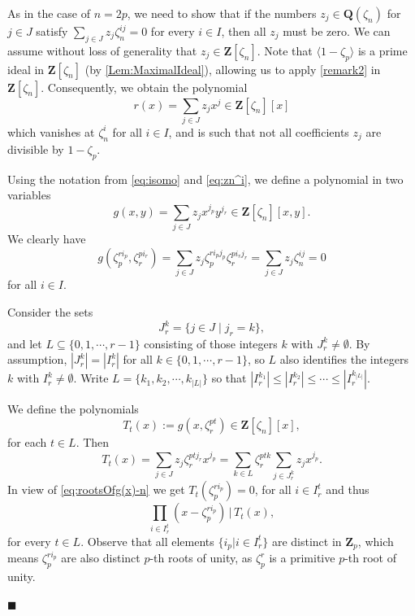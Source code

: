 \documentclass[10pt,a4paper]{amsart}
\newenvironment{proofofB}{{\bf {Proof of Theorem \ref{Thm:B}.} }}{\hfill $\blacksquare$ \\}
\def\Z{\mathbf{Z}}
\def\Q{\mathbf{Q}}
\begin{document}
\begin{proofofB}
As in the case of $n=2p$, we need to show that if the numbers $z_j \in \Q(\zeta_n)$ for $j \in J$ satisfy $\sum_{j \in J} z_j \zeta_n^{ij} = 0$ for every $i \in I$, then all $z_j$ must be zero. We can assume without loss of generality that $z_j \in \Z[\zeta_n]$. Note that $\langle 1 - \zeta_p \rangle$ is a prime ideal in $\Z[\zeta_n]$ (by \autoref{Lem:MaximalIdeal}), allowing us to apply \autoref{remark2} in $\Z[\zeta_n]$. Consequently, we obtain the polynomial 
\begin{equation}\label{eq:r(x)-n}
r(x) = \sum_{j \in J} z_j x^{j} \in \Z[\zeta_n][x]
\end{equation}
which vanishes at $\zeta_n^i$ for all $i \in I$, and is such that not all coefficients $z_j$ are  divisible by $1 - \zeta_p$.

Using the notation from \eqref{eq:isomo} and \eqref{eq:zn^i}, we define a polynomial in two variables 
\begin{equation}\label{eq:g(x)-n}
g(x,y) = \sum_{j \in J }z_jx^{j_p}y^{j_r}  \in \Z[\zeta_n][x,y]. 
\end{equation}
We clearly have 
\begin{equation}\label{eq:rootsOfg(x)-n}
g(\zeta_p^{ri_p},\zeta_r^{pi_r}) = \sum_{j \in J }z_j \zeta_p^{ri_pj_p}\zeta_r^{pi_rj_r} = \sum_{j \in J }z_j \zeta_n^{ij}= 0 
\end{equation}
for all $i \in I$.

Consider the sets 
\begin{equation}
  J_r^k = \{ j \in J \mid j_r = k  \},    
\end{equation}
and let  $L \subseteq \{ 0, 1, \cdots, r-1\}$ consisting  of those integers $k$ with $J_r^k \neq \emptyset$. 
By assumption, $|J_r^k|= |I_r^k|$ for all $k \in \{0, 1, \cdots, r-1\}$, so $L$ also identifies  the integers $k$ with $I_r^k \neq \emptyset$. 
Write $L = \{ k_1, k_2,  \cdots, k_{|L|} \}$ so that 
$|I_r^{k_1}| \leq |I_r^{k_2}| \leq \cdots \leq |I_r^{k_{|L|}}|$. 


We define the polynomials  
\[
T_t(x) := g(x, \zeta_r^{pt}) \in \Z[\zeta_n][x],
\]  
for each  $t \in L$. Then  
\[
T_t(x) = \sum_{j \in J} z_j  \zeta_r^{ptj_r} x^{j_p} = \sum_{k \in L} \zeta_r^{ptk} \sum_{j \in J_r^k} z_j x^{j_p}. 
\]  
In view of \eqref{eq:rootsOfg(x)-n} we get $
T_t(\zeta_p^{ri_p})= 0$, 
for all $i \in I_r^t$ and thus 
\begin{equation}\label{eq:dividesT}
\prod_{i \in I_r^t} (x- \zeta_p^{ri_p}) \, \big|  \, T_t(x), 
\end{equation}
for every $t  \in L$. Observe that all elements $\{ i_p | i \in I_r^t \}$ are distinct in $\Z_p$, which means $\zeta_p^{ri_p}$ are also distinct $p$-th roots of unity, as $\zeta_p^r$ is a primitive $p$-th root of unity.


\end{proofofB}
\end{document}
